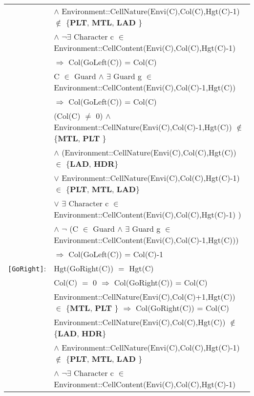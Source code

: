 \documentclass[8pt]{article}
\begin{document}
{\begin{longtable}{rl}
  \\ & \quad\quad $\land$ \textrm{Environment::CellNature(Envi(C),Col(C),Hgt(C)-1)} $\notin$ \{\textbf{PLT}, \textbf{MTL}, \textbf{LAD} \} \\
  & \quad\quad $\land$ $\neg$$\exists$ \textrm{Character} c $\in$ \textrm{Environment::CellContent(Envi(C),Col(C),Hgt(C)-1)} \\
  & \quad\quad $\Rightarrow$ \textrm{Col(GoLeft(C))} = \textrm{Col(C)} \\
  & \textrm{C} $\in$ \textrm{Guard} $\land$ $\exists$ \textrm{Guard} g $\in$ \textrm{Environment::CellContent(Envi(C),Col(C)-1,Hgt(C))} \\ & \quad\quad $\Rightarrow$ \textrm{Col(GoLeft(C))} = \textrm{Col(C)} \\
  & (\textrm{Col(C)} $\neq$ 0) $\land$ \textrm{Environment::CellNature(Envi(C),Col(C)-1,Hgt(C))} $\notin$ \{\textbf{MTL}, \textbf{PLT} \} \\
  & \quad\quad $\land$ (\textrm{Environment::CellNature(Envi(C),Col(C),Hgt(C))} $\in$ \{\textbf{LAD}, \textbf{HDR}\} \\
  & \quad\quad\quad\quad $\lor$ \textrm{Environment::CellNature(Envi(C),Col(C),Hgt(C)-1)} $\in$ \{\textbf{PLT}, \textbf{MTL}, \textbf{LAD}\} \\
  & \quad\quad\quad\quad $\lor$ $\exists$ \textrm{Character} c $\in$ \textrm{Environment::CellContent(Envi(C),Col(C),Hgt(C)-1)} ) \\
  & \quad\quad $\land$ $\neg$ (\textrm{C} $\in$ \textrm{Guard} $\land$ $\exists$ \textrm{Guard} g $\in$ \textrm{Environment::CellContent(Envi(C),Col(C)-1,Hgt(C))}) \\
  & \quad\quad $\Rightarrow$ \textrm{Col(GoLeft(C))} = \textrm{Col(C)}-1 \\
\texttt{[GoRight]}: & \textrm{Hgt(GoRight(C))} $=$ \textrm{Hgt(C)} \\
  & \textrm{Col(C)} $=$ 0 $\Rightarrow$ \textrm{Col(GoRight(C))} = \textrm{Col(C)} \\
  & \textrm{Environment::CellNature(Envi(C),Col(C)+1,Hgt(C))} $\in$ \{\textbf{MTL}, \textbf{PLT} \} $\Rightarrow$ \textrm{Col(GoRight(C))} = \textrm{Col(C)} \\
  & \textrm{Environment::CellNature(Envi(C),Col(C),Hgt(C))} $\notin$ \{\textbf{LAD}, \textbf{HDR}\}
  \\ & \quad\quad $\land$ \textrm{Environment::CellNature(Envi(C),Col(C),Hgt(C)-1)} $\notin$ \{\textbf{PLT}, \textbf{MTL}, \textbf{LAD} \} \\
  & \quad\quad $\land$ $\neg$$\exists$ \textrm{Character} c $\in$ \textrm{Environment::CellContent(Envi(C),Col(C),Hgt(C)-1)} \\

\end{longtable}}
\end{document}
